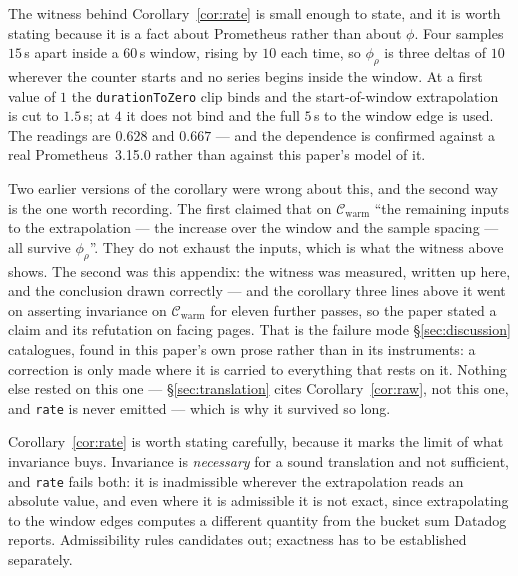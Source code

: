 
\inlineonly{\noindent}%
The witness behind Corollary~\ref{cor:rate} is small enough to state, and it is worth
stating because it is a fact about Prometheus rather than about $\phi$. Four samples
$15$\,s apart inside a $60$\,s window, rising by $10$ each time, so $\phi_\rho$ is three
deltas of $10$ wherever the counter starts and no series begins inside the window. At a
first value of $1$ the \texttt{durationToZero} clip binds and the start-of-window
extrapolation is cut to $1.5$\,s; at $4$ it does not bind and the full $5$\,s to the
window edge is used. The readings are $0.628$ and $0.667$ --- and the dependence is
confirmed against a real Prometheus~3.15.0 rather than against this paper's model of it.

\noindent
Two earlier versions of the corollary were wrong about this, and the second way is the
one worth recording. The first claimed that on $\mathcal{C}_{\mathrm{warm}}$ ``the
remaining inputs to the extrapolation --- the increase over the window and the sample
spacing --- all survive $\phi_\rho$''. They do not exhaust the inputs, which is what the
witness above shows. The second was this appendix: the witness was measured, written up
here, and the conclusion drawn correctly --- and the corollary three lines above it went
on asserting invariance on $\mathcal{C}_{\mathrm{warm}}$ for eleven further passes, so
the paper stated a claim and its refutation on facing pages. That is the failure mode
\S\ref{sec:discussion} catalogues, found in this paper's own prose rather than in its
instruments: a correction is only made where it is carried to everything that rests on
it. Nothing else rested on this one --- \S\ref{sec:translation} cites
Corollary~\ref{cor:raw}, not this one, and \texttt{rate} is never emitted --- which is
why it survived so long.

\noindent
Corollary~\ref{cor:rate} is worth stating carefully, because it marks the limit of what
invariance buys. Invariance is \emph{necessary} for a sound translation and not
sufficient, and \texttt{rate} fails both: it is inadmissible wherever the extrapolation
reads an absolute value, and even where it is admissible it is not exact, since
extrapolating to the window edges computes a different quantity from the bucket sum
Datadog reports. Admissibility rules candidates out; exactness has to be established
separately.
